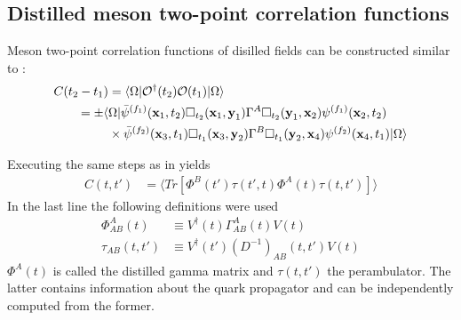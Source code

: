 \subsection{Distilled meson two-point correlation functions}
    Meson two-point correlation functions of disilled fields can be constructed similar to :
    \begin{equation}
        \begin{aligned}
            C(t_2 - t_1) &= \langle\Omega| \mathcal{O}^\dagger(t_2) \mathcal{O}(t_1)|\Omega\rangle\\
            = \pm\langle&\Omega| \bar{\psi}^{(f_1)}(\textbf{x}_1,t_2)\Box_{t_2}(\textbf{x}_1,\textbf{y}_1)\Gamma^A
            \Box_{t_2}(\textbf{y}_1,\textbf{x}_2)\psi^{(f_1)}(\textbf{x}_2,t_2)\\
            &\times \bar{\psi}^{(f_2)}(\textbf{x}_3,t_1)\Box_{t_1}(\textbf{x}_3,\textbf{y}_2)\Gamma^B
            \Box_{t_1}(\textbf{y}_2,\textbf{x}_4)\psi^{(f_2)}(\textbf{x}_4,t_1) |\Omega\rangle
        \end{aligned}
    \end{equation}

    Executing the same steps as in  yields
    \begin{equation}
        \begin{aligned}
            C(t,t') &= \langle Tr[\Phi^B(t')\tau(t',t)\Phi^A(t)\tau(t,t')] \rangle
        \end{aligned}
    \end{equation}
    In the last line the following definitions were used
    \begin{equation}
        \begin{aligned}\label{def_gamma_and_perambulator}
            \Phi_{AB}^A(t) &\equiv V^\dagger(t)\Gamma_{AB}^A(t)V(t)\\
            \tau_{AB}(t,t') &\equiv V^\dagger(t')(D^{-1})_{AB}(t,t')V(t)
        \end{aligned}
    \end{equation}
    $\Phi^A(t)$ is called the distilled gamma matrix and $\tau(t,t')$ the perambulator. The latter contains information about the quark propagator and can be independently computed from the former.
    
